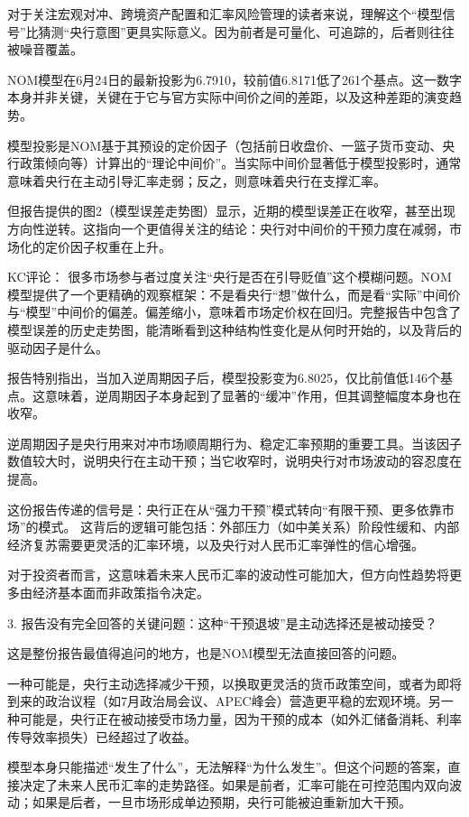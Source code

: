 \documentclass[11pt]{ctexart}
\begin{document}
对于关注宏观对冲、跨境资产配置和汇率风险管理的读者来说，理解这个“模型信号”比猜测“央行意图”更具实际意义。因为前者是可量化、可追踪的，后者则往往被噪音覆盖。

NOM模型在6月24日的最新投影为6.7910，较前值6.8171低了261个基点。这一数字本身并非关键，关键在于它与官方实际中间价之间的差距，以及这种差距的演变趋势。

模型投影是NOM基于其预设的定价因子（包括前日收盘价、一篮子货币变动、央行政策倾向等）计算出的“理论中间价”。当实际中间价显著低于模型投影时，通常意味着央行在主动引导汇率走弱；反之，则意味着央行在支撑汇率。

但报告提供的图2（模型误差走势图）显示，近期的模型误差正在收窄，甚至出现方向性逆转。这指向一个更值得关注的结论：央行对中间价的干预力度在减弱，市场化的定价因子权重在上升。

KC评论： 很多市场参与者过度关注“央行是否在引导贬值”这个模糊问题。NOM模型提供了一个更精确的观察框架：不是看央行“想”做什么，而是看“实际”中间价与“模型”中间价的偏差。偏差缩小，意味着市场定价权在回归。完整报告中包含了模型误差的历史走势图，能清晰看到这种结构性变化是从何时开始的，以及背后的驱动因子是什么。

报告特别指出，当加入逆周期因子后，模型投影变为6.8025，仅比前值低146个基点。这意味着，逆周期因子本身起到了显著的“缓冲”作用，但其调整幅度本身也在收窄。

逆周期因子是央行用来对冲市场顺周期行为、稳定汇率预期的重要工具。当该因子数值较大时，说明央行在主动干预；当它收窄时，说明央行对市场波动的容忍度在提高。

这份报告传递的信号是：央行正在从“强力干预”模式转向“有限干预、更多依靠市场”的模式。 这背后的逻辑可能包括：外部压力（如中美关系）阶段性缓和、内部经济复苏需要更灵活的汇率环境，以及央行对人民币汇率弹性的信心增强。

对于投资者而言，这意味着未来人民币汇率的波动性可能加大，但方向性趋势将更多由经济基本面而非政策指令决定。

3. 报告没有完全回答的关键问题：这种“干预退坡”是主动选择还是被动接受？

这是整份报告最值得追问的地方，也是NOM模型无法直接回答的问题。

一种可能是，央行主动选择减少干预，以换取更灵活的货币政策空间，或者为即将到来的政治议程（如7月政治局会议、APEC峰会）营造更平稳的宏观环境。另一种可能是，央行正在被动接受市场力量，因为干预的成本（如外汇储备消耗、利率传导效率损失）已经超过了收益。

模型本身只能描述“发生了什么”，无法解释“为什么发生”。但这个问题的答案，直接决定了未来人民币汇率的走势路径。如果是前者，汇率可能在可控范围内双向波动；如果是后者，一旦市场形成单边预期，央行可能被迫重新加大干预。
\end{document}
